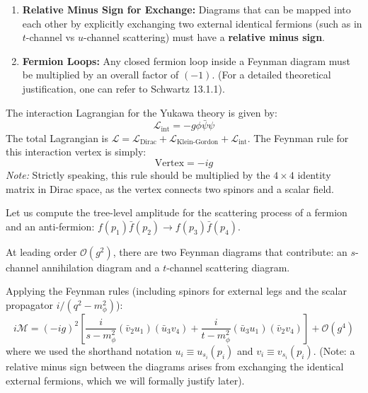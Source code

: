 \begin{enumerate}
    \item \textbf{Relative Minus Sign for Exchange:} Diagrams that can be mapped into each other by explicitly exchanging two external identical fermions (such as in \(t\)-channel vs \(u\)-channel scattering) must have a \textbf{relative minus sign}.

    \item \textbf{Fermion Loops:} Any closed fermion loop inside a Feynman diagram must be multiplied by an overall factor of \((-1)\). (For a detailed theoretical justification, one can refer to Schwartz 13.1.1).
\end{enumerate}

\begin{example}
    The interaction Lagrangian for the Yukawa theory is given by:
    \[
        \mathcal{L}_{\text{int}} = -g \phi \bar{\psi}\psi
    \]
    The total Lagrangian is $\mathcal{L} = \mathcal{L}_{\text{Dirac}} + \mathcal{L}_{\text{Klein-Gordon}} + \mathcal{L}_{\text{int}}$. The Feynman rule for this interaction vertex is simply:
    \[
        \text{Vertex} = -ig
    \]
    \textit{Note:} Strictly speaking, this rule should be multiplied by the $4 \times 4$ identity matrix in Dirac space, as the vertex connects two spinors and a scalar field.
\end{example}

\begin{example}
    Let us compute the tree-level amplitude for the scattering process of a fermion and an anti-fermion: $f(p_1) \bar{f}(p_2) \to f(p_3) \bar{f}(p_4)$.

    At leading order $\mathcal{O}(g^2)$, there are two Feynman diagrams that contribute: an $s$-channel annihilation diagram and a $t$-channel scattering diagram.

    Applying the Feynman rules (including spinors for external legs and the scalar propagator $i/(q^2 - m^2_\phi)$):
    \[
        i\mathcal{M} = (-ig)^2 \left[ \frac{i}{s - m^2_\phi} (\bar{v}_2 u_1)(\bar{u}_3 v_4) + \frac{i}{t - m^2_\phi} (\bar{u}_3 u_1)(\bar{v}_2 v_4) \right] + \mathcal{O}(g^4)
    \]
    where we used the shorthand notation $u_i \equiv u_{s_i}(p_i)$ and $v_i \equiv v_{s_i}(p_i)$. (Note: a relative minus sign between the diagrams arises from exchanging the identical external fermions, which we will formally justify later).
\end{example}

